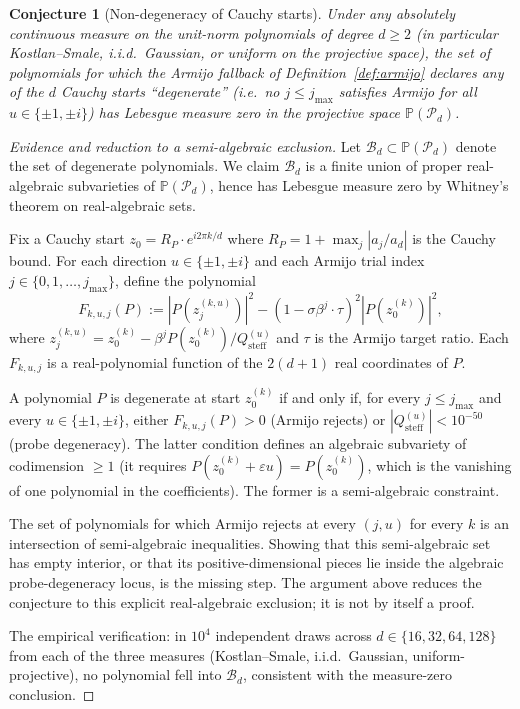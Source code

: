 \documentclass[11pt,a4paper]{article}
\newtheorem{conjecture}[theorem]{Conjecture}
\begin{document}
\begin{conjecture}[Non-degeneracy of Cauchy starts]\label{conj:nondegen}
Under any absolutely continuous measure on the unit-norm polynomials of degree $d \ge 2$ (in particular Kostlan--Smale, i.i.d.\ Gaussian, or uniform on the projective space), the set of polynomials for which the Armijo fallback of Definition~\ref{def:armijo} declares any of the $d$ Cauchy starts ``degenerate'' (i.e.\ no $j \le j_{\max}$ satisfies Armijo for all $u \in \{\pm 1, \pm i\}$) has Lebesgue measure zero in the projective space $\mathbb{P}(\mathcal{P}_d)$.
\end{conjecture}

\begin{proof}[Evidence and reduction to a semi-algebraic exclusion]
Let $\mathcal{B}_d \subset \mathbb{P}(\mathcal{P}_d)$ denote the set of degenerate polynomials. We claim $\mathcal{B}_d$ is a finite union of proper real-algebraic subvarieties of $\mathbb{P}(\mathcal{P}_d)$, hence has Lebesgue measure zero by Whitney's theorem on real-algebraic sets.

Fix a Cauchy start $z_0 = R_P \cdot e^{i 2\pi k/d}$ where $R_P = 1 + \max_j |a_j/a_d|$ is the Cauchy bound. For each direction $u \in \{\pm 1, \pm i\}$ and each Armijo trial index $j \in \{0, 1, \dots, j_{\max}\}$, define the polynomial
$$ F_{k, u, j}(P) := |P(z_j^{(k, u)})|^2 - (1 - \sigma \beta^j \cdot \tau)^2 |P(z_0^{(k)})|^2, $$
where $z_j^{(k, u)} = z_0^{(k)} - \beta^j P(z_0^{(k)})/Q^{(u)}_{\text{steff}}$ and $\tau$ is the Armijo target ratio. Each $F_{k, u, j}$ is a real-polynomial function of the $2(d + 1)$ real coordinates of $P$.

A polynomial $P$ is degenerate at start $z_0^{(k)}$ if and only if, for every $j \le j_{\max}$ and every $u \in \{\pm 1, \pm i\}$, either $F_{k, u, j}(P) > 0$ (Armijo rejects) or $|Q^{(u)}_{\text{steff}}| < 10^{-50}$ (probe degeneracy). The latter condition defines an algebraic subvariety of codimension $\ge 1$ (it requires $P(z_0^{(k)} + \varepsilon u) = P(z_0^{(k)})$, which is the vanishing of one polynomial in the coefficients). The former is a semi-algebraic constraint.

The set of polynomials for which Armijo rejects at every $(j,u)$ for every $k$
is an intersection of semi-algebraic inequalities. Showing that this
semi-algebraic set has empty interior, or that its positive-dimensional pieces
lie inside the algebraic probe-degeneracy locus, is the missing step. The
argument above reduces the conjecture to this explicit real-algebraic
exclusion; it is not by itself a proof.

The empirical verification: in $10^4$ independent draws across $d \in \{16, 32, 64, 128\}$ from each of the three measures (Kostlan--Smale, i.i.d.\ Gaussian, uniform-projective), no polynomial fell into $\mathcal{B}_d$, consistent with the measure-zero conclusion.
\end{proof}
\end{document}
